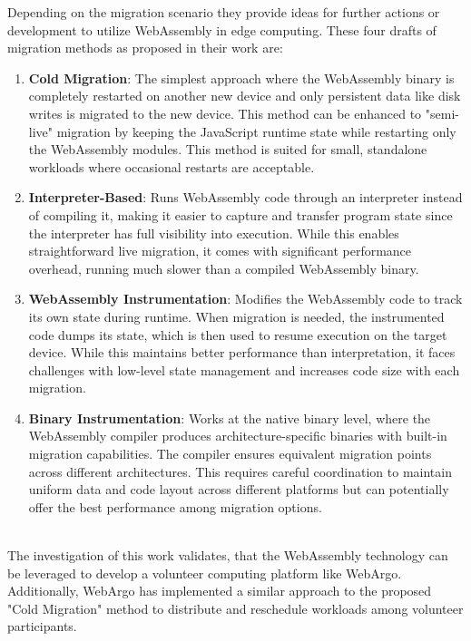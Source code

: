 Depending on the migration scenario they provide ideas for further actions or development to utilize WebAssembly in edge computing. These four drafts of migration methods as proposed in their work are:
\begin{enumerate}
  \item \textbf{Cold Migration}: The simplest approach where the WebAssembly binary is completely restarted on another new device and only persistent data like disk writes is migrated to the new device. This method can be enhanced to "semi-live" migration by keeping the JavaScript runtime state while restarting only the WebAssembly modules. This method is suited for small, standalone workloads where occasional restarts are acceptable. \cite{relatedwork:wasmedgecomputing}
  \item \textbf{Interpreter-Based}: Runs WebAssembly code through an interpreter instead of compiling it, making it easier to capture and transfer program state since the interpreter has full visibility into execution. While this enables straightforward live migration, it comes with significant performance overhead, running much slower than a compiled WebAssembly binary. \cite{relatedwork:wasmedgecomputing} 
  \item \textbf{WebAssembly Instrumentation}: Modifies the WebAssembly code to track its own state during runtime. When migration is needed, the instrumented code dumps its state, which is then used to resume execution on the target device. While this maintains better performance than interpretation, it faces challenges with low-level state management and increases code size with each migration. \cite{relatedwork:wasmedgecomputing}
  \item \textbf{Binary Instrumentation}: Works at the native binary level, where the WebAssembly compiler produces architecture-specific binaries with built-in migration capabilities. The compiler ensures equivalent migration points across different architectures. This requires careful coordination to maintain uniform data and code layout across different platforms but can potentially offer the best performance among migration options. \cite{relatedwork:wasmedgecomputing}
\end{enumerate}
~\\
The investigation of this work validates, that the WebAssembly technology can be leveraged to develop a volunteer computing platform like WebArgo. Additionally, WebArgo has implemented a similar approach to the proposed "Cold Migration" method to distribute and reschedule workloads among volunteer participants.

